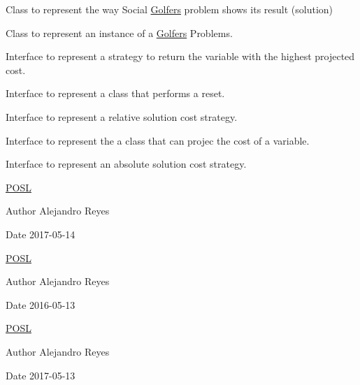Class to represent the way Social \hyperlink{classPOSL_1_1Benchmarks_1_1Golfers}{Golfers} problem shows its result (solution)

Class to represent an instance of a \hyperlink{classPOSL_1_1Benchmarks_1_1Golfers}{Golfers} Problems.

Interface to represent a strategy to return the variable with the highest projected cost.

Interface to represent a class that performs a reset.

Interface to represent a relative solution cost strategy.

Interface to represent the a class that can projec the cost of a variable.

Interface to represent an absolute solution cost strategy.

\hyperlink{namespacePOSL}{P\+O\+SL}

\begin{DoxyAuthor}{Author}
Alejandro Reyes 
\end{DoxyAuthor}
\begin{DoxyDate}{Date}
2017-\/05-\/14
\end{DoxyDate}
\hyperlink{namespacePOSL}{P\+O\+SL}

\begin{DoxyAuthor}{Author}
Alejandro Reyes 
\end{DoxyAuthor}
\begin{DoxyDate}{Date}
2016-\/05-\/13
\end{DoxyDate}
\hyperlink{namespacePOSL}{P\+O\+SL}

\begin{DoxyAuthor}{Author}
Alejandro Reyes 
\end{DoxyAuthor}
\begin{DoxyDate}{Date}
2017-\/05-\/13 
\end{DoxyDate}
